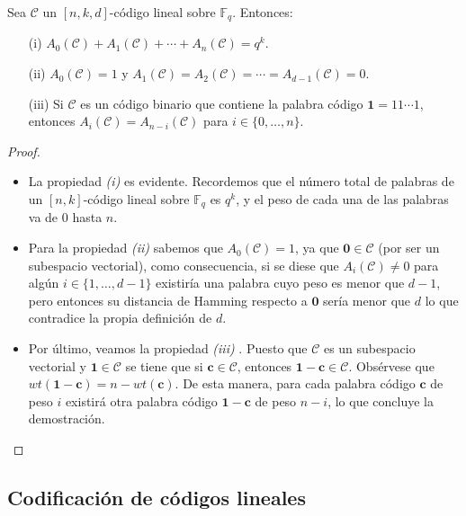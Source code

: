 \begin{teorema}
Sea $\mathcal{C}$ un $[n,k,d]$-código lineal sobre $\mathds{F}_q$. Entonces:
\begin{enumerate}
  \item[(i)] $A_0(\mathcal{C}) + A_1(\mathcal{C}) + \cdots + A_n(\mathcal{C}) = q^k$.
  \item[(ii)] $A_0(\mathcal{C}) = 1$ y $A_1(\mathcal{C}) = A_2(\mathcal{C}) = \cdots = A_{d-1}(\mathcal{C}) = 0$.
  \item[(iii)] Si $\mathcal{C}$ es un código binario que contiene la palabra código $\mathbf{1} = 11\cdots 1$, entonces $A_i(\mathcal{C}) = A_{n-i}(\mathcal{C})$ para $i \in \{0,\dots,n\}$.
\end{enumerate}
\end{teorema}

\begin{proof}
  \hphantom \\
  \begin{itemize} 
  \item La propiedad \textit{(i)} es evidente. Recordemos que el número total de palabras de un $[n,k]$-código lineal sobre $\mathds{F}_q$ es $q^k$, y el peso de cada una de las palabras va de $0$ hasta $n$.
  \item Para la propiedad \textit{(ii)}  sabemos que $A_0(\mathcal{C}) = 1$, ya que $\mathbf{0} \in \mathcal{C}$ (por ser un subespacio vectorial), como consecuencia, si se diese que $A_i(\mathcal{C}) \neq 0$ para algún $i \in \{1,\dots,d-1\}$ existiría una palabra cuyo peso es menor que $d-1$, pero entonces su distancia de Hamming respecto a $\mathbf{0}$ sería menor que $d$ lo que contradice la propia definición de $d$.
  \item Por último, veamos la propiedad \textit{(iii)} . Puesto que $\mathcal{C}$ es un subespacio vectorial y $\mathbf{1} \in \mathcal{C}$ se tiene que si $\mathbf{c} \in \mathcal{C}$, entonces  $\mathbf{1-\mathbf{c}} \in \mathcal{C}$. Obsérvese que $wt(\mathbf{1-c}) = n - wt(\mathbf{c})$. De esta manera, para cada palabra código $\mathbf{c}$ de peso $i$ existirá otra palabra código $\mathbf{1-c}$ de peso $n-i$, lo que concluye la demostración.
  \end{itemize}
\end{proof}

\subsection{Codificación de códigos lineales}\label{sec:1.3}

